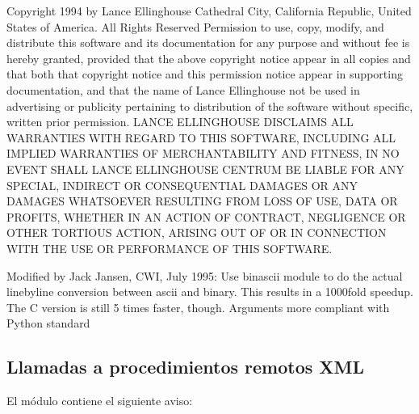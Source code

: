 \documentclass[a4,10pt,spanish]{sphinxmanual}
\begin{document}
\begin{sphinxVerbatim}[commandchars=\\\{\}]
Copyright 1994 by Lance Ellinghouse
Cathedral City, California Republic, United States of America.
                       All Rights Reserved
Permission to use, copy, modify, and distribute this software and its
documentation for any purpose and without fee is hereby granted,
provided that the above copyright notice appear in all copies and that
both that copyright notice and this permission notice appear in
supporting documentation, and that the name of Lance Ellinghouse
not be used in advertising or publicity pertaining to distribution
of the software without specific, written prior permission.
LANCE ELLINGHOUSE DISCLAIMS ALL WARRANTIES WITH REGARD TO
THIS SOFTWARE, INCLUDING ALL IMPLIED WARRANTIES OF MERCHANTABILITY AND
FITNESS, IN NO EVENT SHALL LANCE ELLINGHOUSE CENTRUM BE LIABLE
FOR ANY SPECIAL, INDIRECT OR CONSEQUENTIAL DAMAGES OR ANY DAMAGES
WHATSOEVER RESULTING FROM LOSS OF USE, DATA OR PROFITS, WHETHER IN AN
ACTION OF CONTRACT, NEGLIGENCE OR OTHER TORTIOUS ACTION, ARISING OUT
OF OR IN CONNECTION WITH THE USE OR PERFORMANCE OF THIS SOFTWARE.

Modified by Jack Jansen, CWI, July 1995:
\PYGZhy{} Use binascii module to do the actual line\PYGZhy{}by\PYGZhy{}line conversion
  between ascii and binary. This results in a 1000\PYGZhy{}fold speedup. The C
  version is still 5 times faster, though.
\PYGZhy{} Arguments more compliant with Python standard
\end{sphinxVerbatim}


\subsection{Llamadas a procedimientos remotos XML}
\label{\detokenize{license:xml-remote-procedure-calls}}
\sphinxAtStartPar
El módulo  contiene el siguiente aviso:
\end{document}

